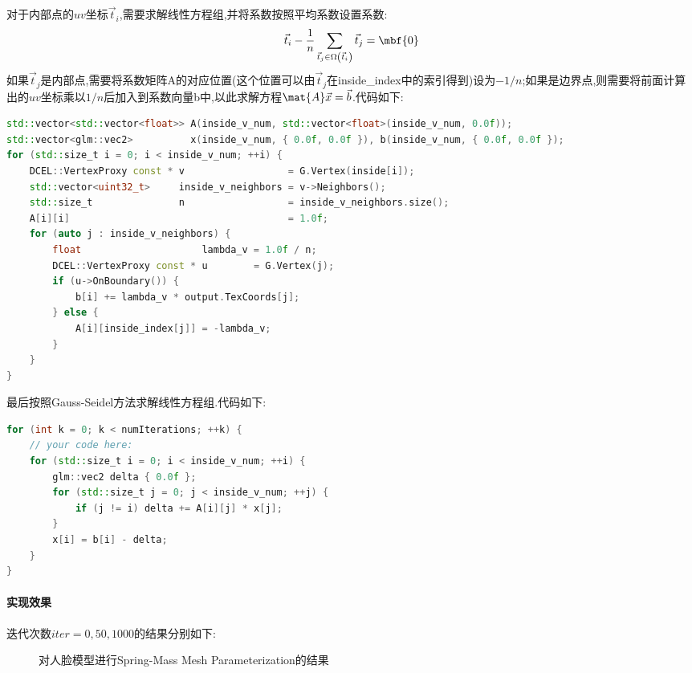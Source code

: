 \documentclass{ctexart}
\begin{document}
对于内部点的$uv$坐标$\vec{t}_i$,需要求解线性方程组,并将系数按照平均系数设置系数:
\[\vec{t}_i-\dfrac{1}{n}\sum_{\vec{t}_j\in\Omega\left(\vec{t}_i\right)}\vec{t}_j=\mbf{0}\]
如果$\vec{t}_j$是内部点,需要将系数矩阵{\codefont A}的对应位置(这个位置可以由$\vec{t}_j$在{\codefont inside\_index}中的索引得到)设为$-1/n$;如果是边界点,则需要将前面计算出的$uv$坐标乘以$1/n$后加入到系数向量{\codefont b}中,以此求解方程$\mat{A}\vec{x}=\vec{b}$.代码如下:
\begin{lstlisting}[language=C++]
std::vector<std::vector<float>> A(inside_v_num, std::vector<float>(inside_v_num, 0.0f));
std::vector<glm::vec2>          x(inside_v_num, { 0.0f, 0.0f }), b(inside_v_num, { 0.0f, 0.0f });
for (std::size_t i = 0; i < inside_v_num; ++i) {
    DCEL::VertexProxy const * v                  = G.Vertex(inside[i]);
    std::vector<uint32_t>     inside_v_neighbors = v->Neighbors();
    std::size_t               n                  = inside_v_neighbors.size();
    A[i][i]                                      = 1.0f;
    for (auto j : inside_v_neighbors) {
        float                     lambda_v = 1.0f / n;
        DCEL::VertexProxy const * u        = G.Vertex(j);
        if (u->OnBoundary()) {
            b[i] += lambda_v * output.TexCoords[j];
        } else {
            A[i][inside_index[j]] = -lambda_v;
        }
    }
}
\end{lstlisting}
最后按照Gauss-Seidel方法求解线性方程组.代码如下:
\begin{lstlisting}[language=C++]
for (int k = 0; k < numIterations; ++k) {
    // your code here:
    for (std::size_t i = 0; i < inside_v_num; ++i) {
        glm::vec2 delta { 0.0f };
        for (std::size_t j = 0; j < inside_v_num; ++j) {
            if (j != i) delta += A[i][j] * x[j];
        }
        x[i] = b[i] - delta;
    }
}
\end{lstlisting}
\paragraph{实现效果}
迭代次数$iter=0,50,1000$的结果分别如下:
\begin{figure}[H]
    \centering
    \qquad\qquad
    \qquad\qquad
    \caption{对人脸模型进行Spring-Mass Mesh Parameterization的结果}
\end{figure}
\end{document}
